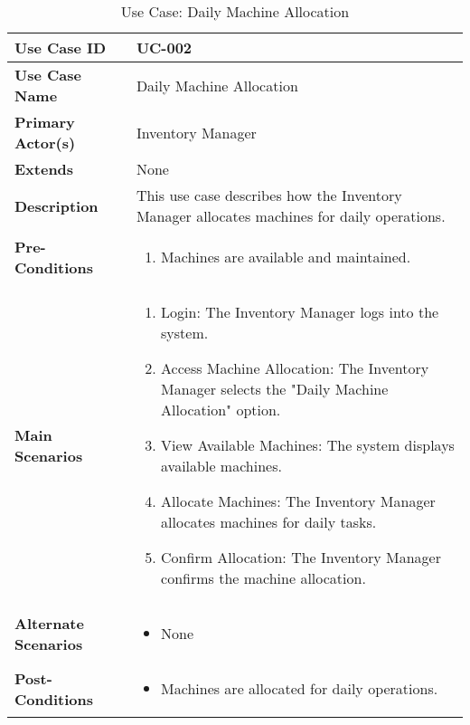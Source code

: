 \documentclass{article}
\begin{document}
\begin{table}[!ht]
    \centering
    \renewcommand{\arraystretch}{1.3} %
    \begin{tabularx}{\textwidth}{|l|X|}
        \hline
        \textbf{Use Case ID} & UC-002 \\
        \hline
        \textbf{Use Case Name} & Daily Machine Allocation \\
        \hline
        \textbf{Primary Actor(s)} & Inventory Manager \\
        \hline
        \textbf{Extends} & None \\
        \hline
        \textbf{Description} & This use case describes how the Inventory Manager allocates machines for daily operations. \\
        \hline
        \textbf{Pre-Conditions} & 
        \begin{enumerate}[label=\arabic*.,itemsep=0pt]
            \item Machines are available and maintained.
        \end{enumerate} \\
        \hline
        \textbf{Main Scenarios} & 
        \begin{enumerate}[label=\arabic*.,itemsep=0pt]
            \item Login: The Inventory Manager logs into the system.
            \item Access Machine Allocation: The Inventory Manager selects the "Daily Machine Allocation" option.
            \item View Available Machines: The system displays available machines.
            \item Allocate Machines: The Inventory Manager allocates machines for daily tasks.
            \item Confirm Allocation: The Inventory Manager confirms the machine allocation.
        \end{enumerate} \\
        \hline
        \textbf{Alternate Scenarios} & 
        \begin{itemize}[label=--,itemsep=0pt]
            \item None
        \end{itemize} \\
        \hline
        \textbf{Post-Conditions} & 
        \begin{itemize}[label=--,itemsep=0pt]
            \item Machines are allocated for daily operations.
        \end{itemize} \\
        \hline
    \end{tabularx}
    \caption{Use Case: Daily Machine Allocation}
    \label{tab:use-case-daily-machine-allocation}
\end{table}
\end{document}
